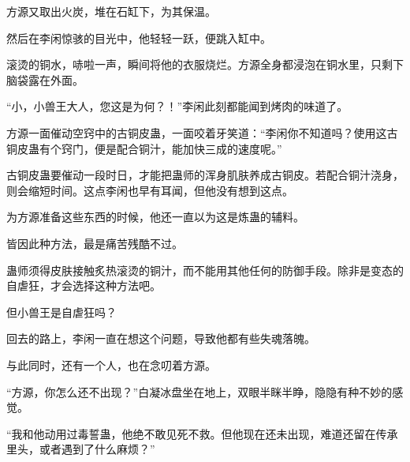 \begin{this_body}
方源又取出火炭，堆在石缸下，为其保温。

然后在李闲惊骇的目光中，他轻轻一跃，便跳入缸中。

滚烫的铜水，哧啦一声，瞬间将他的衣服烧烂。方源全身都浸泡在铜水里，只剩下脑袋露在外面。

“小，小兽王大人，您这是为何？！”李闲此刻都能闻到烤肉的味道了。

方源一面催动空窍中的古铜皮蛊，一面咬着牙笑道：“李闲你不知道吗？使用这古铜皮蛊有个窍门，便是配合铜汁，能加快三成的速度呢。”

古铜皮蛊要催动一段时日，才能把蛊师的浑身肌肤养成古铜皮。若配合铜汁浇身，则会缩短时间。这点李闲也早有耳闻，但他没有想到这点。

为方源准备这些东西的时候，他还一直以为这是炼蛊的辅料。

皆因此种方法，最是痛苦残酷不过。

蛊师须得皮肤接触炙热滚烫的铜汁，而不能用其他任何的防御手段。除非是变态的自虐狂，才会选择这种方法吧。

但小兽王是自虐狂吗？

回去的路上，李闲一直在想这个问题，导致他都有些失魂落魄。

与此同时，还有一个人，也在念叨着方源。

“方源，你怎么还不出现？”白凝冰盘坐在地上，双眼半眯半睁，隐隐有种不妙的感觉。

“我和他动用过毒誓蛊，他绝不敢见死不救。但他现在还未出现，难道还留在传承里头，或者遇到了什么麻烦？”

\end{this_body}

